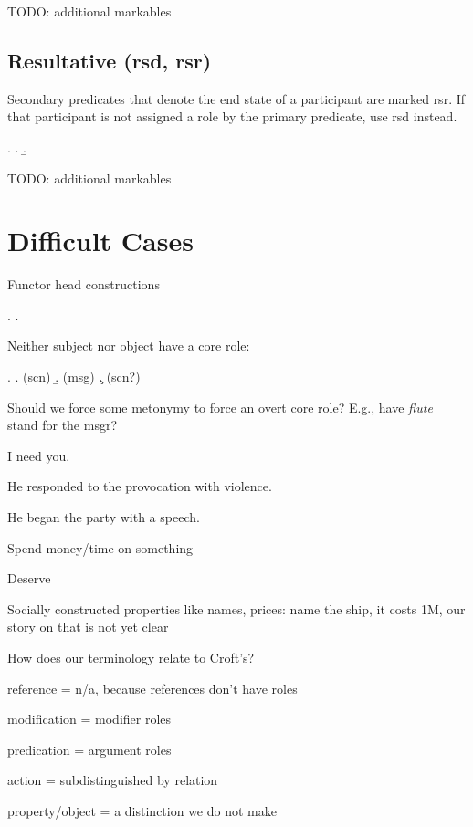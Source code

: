 \documentclass[a4paper]{article}
\begin{document}
TODO: additional markables

\clearpage
\subsection{Resultative (\textsf{rsd}, \textsf{rsr})}
\label{sec:rsd}\label{sec:rsr}

Secondary predicates that denote the end state of a participant are marked
\textsf{rsr}. If that participant is not assigned a role by the primary
predicate, use \textsf{rsd} instead.

\ex.
\a. 
\b. 

TODO: additional markables

\clearpage
\section{Difficult Cases}

Functor head constructions

\ex. \a. 

Neither subject nor object have a core role:

\ex. \a.  (scn)
     \b.  (msg)
     \c.  (scn?)

Should we force some metonymy to force an overt core role? E.g., have \emph{flute} stand for the msgr?

I need you.

He responded to the provocation with violence.

He began the party with a speech.

Spend money/time on something

Deserve

Socially constructed properties like names, prices: name the ship, it costs 1M, our story on that is not yet clear

How does our terminology relate to Croft's?

reference = n/a, because references don't have roles

modification = modifier roles

predication = argument roles

action = subdistinguished by relation

property/object = a distinction we do not make
\end{document}
